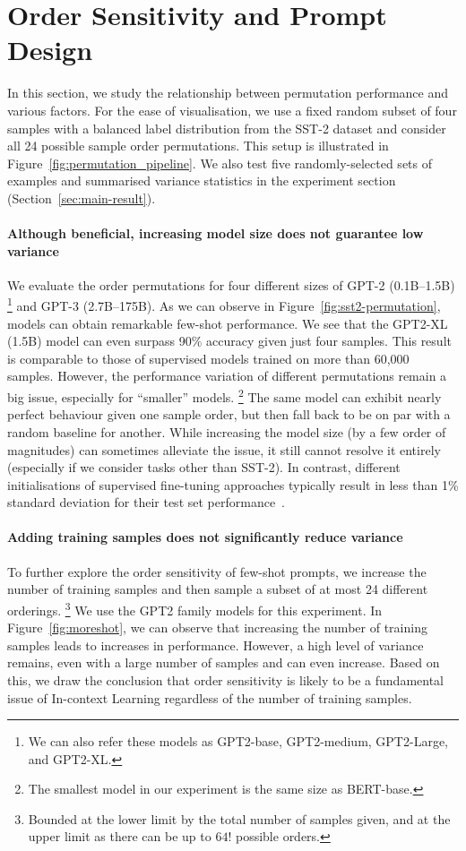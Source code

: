 \section{Order Sensitivity and Prompt Design}\label{sec:order}
In this section, we study the relationship between permutation performance and various factors. For the ease of visualisation, we use a fixed random subset of four samples with a balanced label distribution from the SST-2 dataset and consider all 24 possible sample order permutations. This setup is illustrated in Figure~\ref{fig:permutation_pipeline}. 
We also test five randomly-selected sets of examples and summarised variance statistics in the experiment section (Section~\ref{sec:main-result}).

\paragraph{Although beneficial, increasing model size does not guarantee low variance} We evaluate the order permutations for four different sizes of GPT-2 (0.1B--1.5B)
\footnote{We can also refer these models as GPT2-base, GPT2-medium, GPT2-Large, and GPT2-XL.} and GPT-3 (2.7B--175B). As we can observe in Figure~\ref{fig:sst2-permutation}, models can obtain remarkable few-shot performance. We see that the GPT2-XL (1.5B) model can even surpass 90\% accuracy given just four samples. This result is comparable to those of supervised models trained on more than 60,000 samples. However, the performance variation of different permutations remain a big issue, especially for ``smaller'' models.
\footnote{
    The smallest model in our experiment is the same size as BERT-base. } The same model can exhibit nearly perfect behaviour given one sample order, but then fall back to be on par with a random baseline for another. While increasing the model size (by a few order of magnitudes) can sometimes alleviate the issue, it still cannot resolve it entirely (especially if we consider tasks other than SST-2). In contrast, different initialisations of supervised fine-tuning approaches typically result in less than 1\% standard deviation for their test set performance~\cite{gao2020making}.

\paragraph{Adding training samples does not significantly reduce variance} To further explore the order sensitivity of few-shot prompts, we increase the number of training samples and then sample a subset of at most 24 different orderings.
\footnote{
    Bounded at the lower limit by the total number of samples given, and at the upper limit as there can be up to $64!$ possible orders. } We use the GPT2 family models for this experiment. In Figure~\ref{fig:moreshot}, we can observe that increasing the number of training samples leads to increases in performance. However, a high level of variance remains, even with a large number of samples and can even increase. Based on this, we draw the conclusion that order sensitivity is likely to be a fundamental issue of In-context Learning regardless of the number of training samples.

